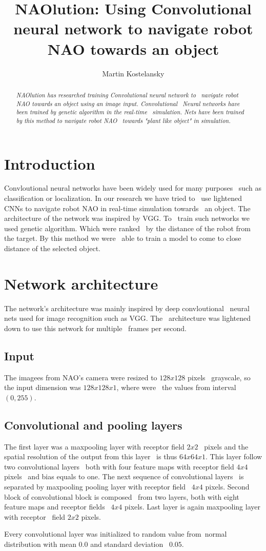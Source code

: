 \documentclass[twocolumn,10pt]{asme2ej}
\title{NAOlution: Using Convolutional neural network to navigate robot NAO towards an object}
\author{Martin Kostelansky
    \affiliation{
	Faculty of Informaion Technology\\
	Czech Technical University\\
	Prague, Czechia\\
    Email: kostema3@fit.cvut.cz
    }	
}
\begin{document}
\maketitle
\begin{abstract}
{\it NAOlution has researched training Convolutional neural network to \
navigate robot NAO towards an object using an image input. Convolutional \
Neural networks have been trained by genetic algorithm in the real-time \
simulation. Nets have been trained by this method to navigate robot NAO \
towards "plant like object" in simulation.}

\end{abstract}

\section{Introduction}
Convloutional neural networks have been widely used for many purposes \
such as classification or localization. In our research we have tried to \
use lightened CNNs to navigate robot NAO in real-time simulation towards \
an object. The architecture of the network was inspired by VGG\cite{VGG16}. To \
train such networks we used genetic algorithm. Which were ranked \ 
by the distance of the robot from the target. By this method we were \
able to train a model to come to close distance of the selected object.

\section{Network architecture}
\label{sec:architecture}
The network's architecture was mainly inspired by deep convloutional \
neural nets used for image recognition such as VGG\cite{VGG16}. The \
architecture was lightened down to use this network for multiple \
frames per second.
\subsection{Input}
The imagees from NAO's camera were resized to $128x128$ pixels \
grayscale, so the input dimension was $128x128x1$, where were \
the values from interval $(0,255)$.
\subsection{Convolutional and pooling layers}
The first layer was a maxpooling layer with receptor field $2x2$ \
pixels and the spatial resolution of the output from this layer \
is thus $64x64x1$. This layer follow two convolutional layers \
both with four feature maps with receptor field $4x4$ pixels \
and bias equals to one. The next sequence of convolutional layers \
is separated by maxpooling pooling layer with receptor field \
$4x4$ pixels. Second block of convolutional block is composed \
from two layers, both with eight feature maps and receptor fields \
$4x4$ pixels. Last layer is again maxpooling layer with receptor \
field $2x2$ pixels.
\par Every convolutional layer was initialized to random value from\
normal distribution with mean $0.0$ and standard deviation \
$0.05$.
\end{document}
